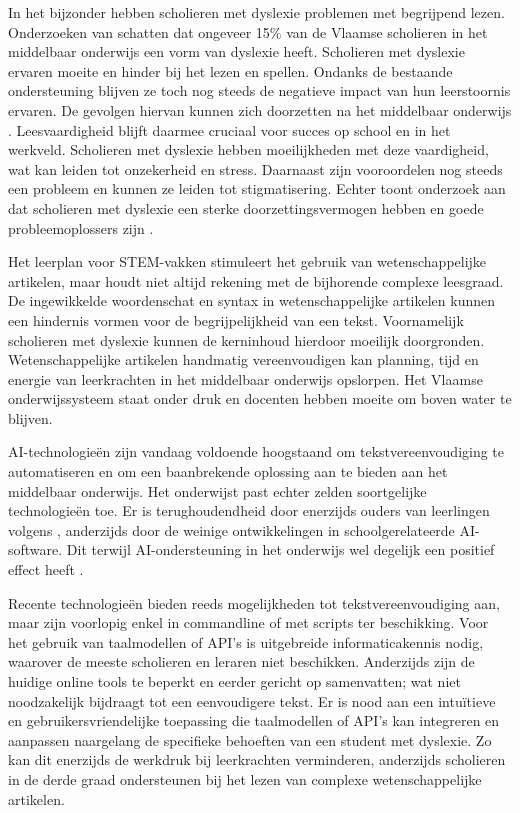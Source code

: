 In het bijzonder hebben scholieren met dyslexie problemen met begrijpend lezen. Onderzoeken van \textcite{Bonte2020, VanDerMeer2022} schatten dat ongeveer 15\% van de Vlaamse scholieren in het middelbaar onderwijs een vorm van dyslexie heeft. Scholieren met dyslexie ervaren moeite en hinder bij het lezen en spellen. Ondanks de bestaande ondersteuning blijven ze toch nog steeds de negatieve impact van hun leerstoornis ervaren. De gevolgen hiervan  kunnen zich doorzetten na het middelbaar onderwijs \autocite{Lissens2020}. Leesvaardigheid blijft daarmee cruciaal voor succes op school en in het werkveld. Scholieren met dyslexie hebben moeilijkheden met deze vaardigheid, wat kan leiden tot onzekerheid en stress. Daarnaast zijn vooroordelen nog steeds een probleem en kunnen ze leiden tot stigmatisering. Echter toont onderzoek aan dat scholieren met dyslexie een sterke doorzettingsvermogen hebben en goede probleemoplossers zijn \autocite{Ghesquiere2018, Lissens2020, Bonte2020}. 

\medspace

Het leerplan voor STEM-vakken stimuleert het gebruik van wetenschappelijke artikelen, maar houdt niet altijd rekening met de bijhorende complexe leesgraad. De ingewikkelde woordenschat en syntax in wetenschappelijke artikelen kunnen een hindernis vormen voor de begrijpelijkheid van een tekst. Voornamelijk scholieren met dyslexie kunnen de kerninhoud hierdoor moeilijk doorgronden. Wetenschappelijke artikelen handmatig vereenvoudigen kan planning, tijd en energie van leerkrachten in het middelbaar onderwijs opslorpen. Het Vlaamse onderwijssysteem staat onder druk en docenten hebben moeite om boven water te blijven. 

\medspace

AI-technologieën zijn vandaag voldoende hoogstaand om tekstvereenvoudiging te automatiseren en om een baanbrekende oplossing aan te bieden aan het middelbaar onderwijs. Het onderwijst past echter zelden soortgelijke technologieën toe. Er is terughoudendheid door enerzijds ouders van leerlingen volgens \textcite{Martens2021a}, anderzijds door de weinige ontwikkelingen in schoolgerelateerde AI-software. Dit terwijl AI-ondersteuning in het onderwijs wel degelijk een positief effect heeft \autocite{Belpaeme2018, Kraft2020}. 

\medspace

Recente technologieën bieden reeds mogelijkheden tot tekstvereenvoudiging aan, maar zijn voorlopig enkel in commandline of met scripts ter beschikking. Voor het gebruik van taalmodellen of API's is uitgebreide informaticakennis nodig, waarover de meeste scholieren en leraren niet beschikken. Anderzijds zijn de huidige online tools te beperkt en eerder gericht op samenvatten; wat niet noodzakelijk bijdraagt tot een eenvoudigere tekst. Er is nood aan een intuïtieve en gebruikersvriendelijke toepassing die taalmodellen of API's kan integreren en aanpassen naargelang de specifieke behoeften van een student met dyslexie. Zo kan dit enerzijds de werkdruk bij leerkrachten verminderen, anderzijds scholieren in de derde graad ondersteunen bij het lezen van complexe wetenschappelijke artikelen. 

